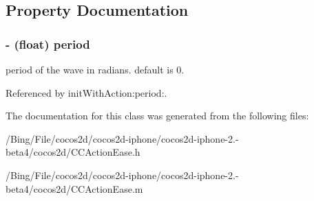 \subsection{Property Documentation}
\hypertarget{interface_c_c_ease_elastic_a11ec74f9a6af505355448f67bfa1cdb4}{
\subsubsection[{period}]{\setlength{\rightskip}{0pt plus 5cm}-\/ (float) {\bf period}}}\label{interface_c_c_ease_elastic_a11ec74f9a6af505355448f67bfa1cdb4}
period of the wave in radians. default is 0. 

Referenced by init\-With\-Action\-:period\-:.



The documentation for this class was generated from the following files\-:\begin{DoxyCompactItemize}
\item 
/\-Bing/\-File/cocos2d/cocos2d-\/iphone/cocos2d-\/iphone-\/2.-\/beta4/cocos2d/C\-C\-Action\-Ease.\-h\item 
/\-Bing/\-File/cocos2d/cocos2d-\/iphone/cocos2d-\/iphone-\/2.-\/beta4/cocos2d/C\-C\-Action\-Ease.\-m\end{DoxyCompactItemize}
